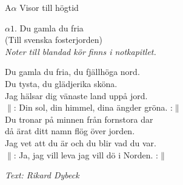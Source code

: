 \documentclass[a6paper,10pt]{article}
\begin{document}
\noindent
\huge{A$\alpha$ Visor till högtid}
\begin{center}
\vspace{0in}
\Large $\alpha1$. Du gamla du fria \\ 
\large (Till svenska fosterjorden) \\
\small\textit{Noter till blandad kör finns i notkapitlet.}
\end{center}
\small Du gamla du fria, du fjällhöga nord. \\
Du tysta, du glädjerika sköna. \\
Jag hälsar dig vänaste land uppå jord.\\
$\|$: Din sol, din himmel, dina ängder gröna. :$\|$\\
\newline
Du tronar på minnen från fornstora dar\\
då ärat ditt namn flög över jorden.\\
Jag vet att du är och du blir vad du var.\\
$\|$: Ja, jag vill leva jag vill dö i Norden. :$\|$\\
\begin{flushright}
\textit{Text: Rikard Dybeck} 
\end{flushright}
\end{document}
